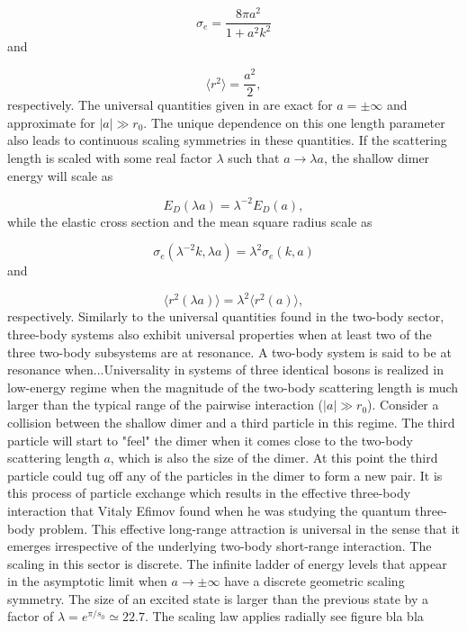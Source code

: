 \documentclass{article}
\providecommand{\abs}[1]{\lvert#1\rvert} \providecommand{\norm}[1]{\lVert#1\rVert}
\begin{document}
\begin{equation}\label{elasticcross}
\sigma_e = \frac{8\pi a^2}{1 + a^2k^2}
\end{equation}
and

\begin{equation}\label{meanradius}
\langle r^2\rangle = \frac{a^2}{2},
\end{equation}
respectively. The universal quantities given in  are exact for $a=\pm \infty$ and approximate for $\abs{a}\gg r_0$. The unique dependence on this one length parameter also leads to continuous scaling symmetries in these quantities. If the scattering length is scaled with some real factor $\lambda$ such that $a \to \lambda a$, the shallow dimer energy will scale as 

\begin{equation}
E_D(\lambda a) = \lambda^{-2}E_D(a),
\end{equation}    
while the elastic cross section and the mean square radius scale as 

\begin{equation}
\sigma_e(\lambda^{-2}k,\lambda a) = \lambda^2 \sigma_e(k,a)
\end{equation}
and

\begin{equation}
\langle r^2(\lambda a)\rangle = \lambda^2 \langle r^2(a)\rangle ,
\end{equation}
respectively. Similarly to the universal quantities found in the two-body sector, three-body systems also exhibit universal properties when at least two of the three two-body subsystems are at resonance. A two-body system is said to be at resonance when...Universality in systems of three identical bosons is realized in low-energy regime when the magnitude of the two-body scattering length is much larger than the typical range of the pairwise interaction ($\abs{a} \gg r_0$). Consider a collision between the shallow dimer and a third particle in this regime. The third particle will start to "feel" the dimer when it comes close to the two-body scattering length $a$, which is also the size of the dimer. At this point the third particle could tug off any of the particles in the dimer to form a new pair. It is this process of particle exchange which results in the effective three-body interaction that Vitaly Efimov found when he was studying the quantum three-body problem. This effective long-range attraction is universal in the sense that it emerges irrespective of the underlying two-body short-range interaction. The scaling in this sector is discrete. The infinite ladder of energy levels that appear in the asymptotic limit when $a \to \pm \infty$ have a discrete geometric scaling symmetry. The size of an excited state is larger than the previous state by a factor of $\lambda = e^{\pi/s_0} \simeq 22.7$. The scaling law applies radially see figure bla bla %
\end{document}
